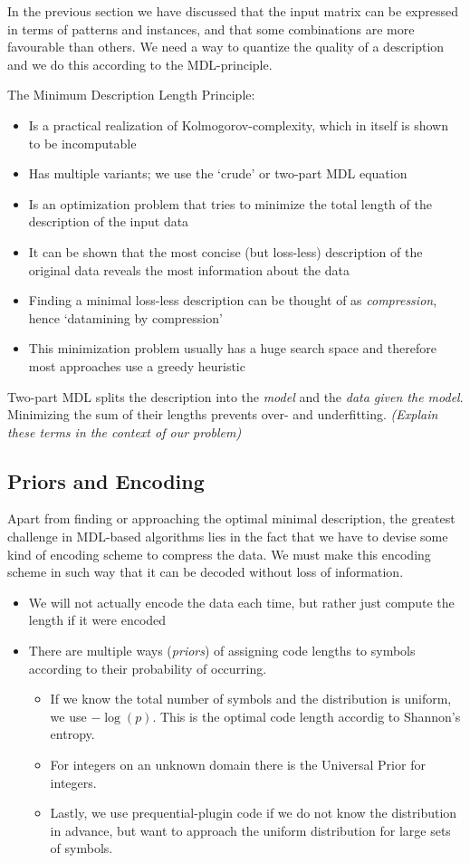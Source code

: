 \documentclass[a4paper,notoc,oneside]{tufte-book}
\begin{document}
In the previous section we have discussed that the input matrix can be expressed in terms of patterns and instances, and that some combinations are more favourable than others. We need a way to quantize the quality of a description and we do this according to the MDL-principle. 

The Minimum Description Length Principle:
\begin{itemize}
\item Is a practical realization of Kolmogorov-complexity, which in itself is shown to be incomputable
\item Has multiple variants; we use the `crude' or two-part MDL equation
\item Is an optimization problem that tries to minimize the total length of the description of the input data
\item It can be shown that the most concise (but loss-less) description of the original data reveals the most information about the data
\item Finding a minimal loss-less description can be thought of as \emph{compression}, hence `datamining by compression'
\item This minimization problem usually has a huge search space and therefore most approaches use a greedy heuristic
\end{itemize}

Two-part MDL splits the description into the \emph{model} and the \emph{data given the model}. Minimizing the sum of their lengths prevents over- and underfitting. \emph{(Explain these terms in the context of our problem)}

\subsection{Priors and Encoding}

Apart from finding or approaching the optimal minimal description, the greatest challenge in MDL-based algorithms lies in the fact that we have to devise some kind of encoding scheme to compress the data. We must make this encoding scheme in such way that it can be decoded without loss of information.
\begin{itemize}
\item We will not actually encode the data each time, but rather just compute the length if it were encoded
\item There are multiple ways (\emph{priors}) of assigning code lengths to symbols according to their probability of occurring. \begin{itemize}
\item If we know the total number of symbols and the distribution is uniform, we use $-\log(p)$. This is the optimal code length accordig to Shannon's entropy. 
\item For integers on an unknown domain there is the Universal Prior for integers. 
\item Lastly, we use prequential-plugin code if we do not know the distribution in advance, but want to approach the uniform distribution for large sets of symbols.
\end{itemize}
\end{itemize}
\end{document}
